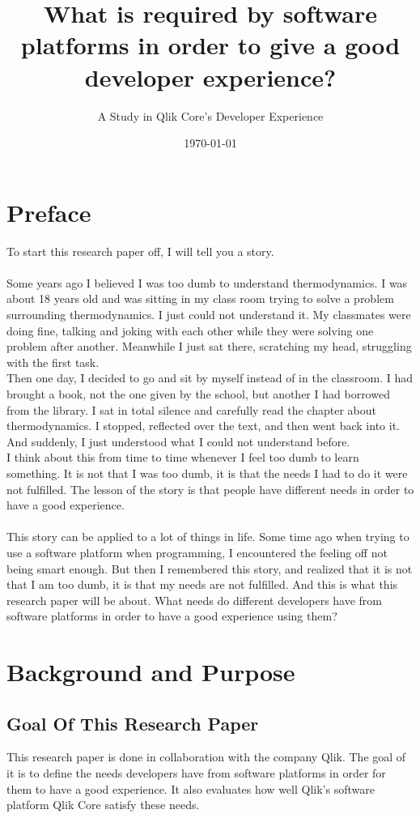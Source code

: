 \documentclass{cslthse-msc}
\title{What is required by software platforms in order to give a good developer experience?}
\subtitle{A Study in Qlik Core's Developer Experience}
\date{\today}
\begin{document}
    \makefrontmatter
    \chapter*{Preface}
    To start this research paper off, I will tell you a story.\\\\
    Some years ago I believed I was too dumb to understand thermodynamics. I was about 18 years old and was sitting in my class room trying to solve a problem surrounding thermodynamics. I just could not understand it. My classmates were doing fine, talking and joking with each other while they were solving one problem after another. Meanwhile I just sat there, scratching my head, struggling with the first task.\\
    Then one day, I decided to go and sit by myself instead of in the classroom. I had brought a book, not the one given by the school, but another I had borrowed from the library. I sat in total silence and carefully read the chapter about thermodynamics. I stopped, reflected over the text, and then went back into it. And suddenly, I just understood what I could not understand before.\\
    I think about this from time to time whenever I feel too dumb to learn something. It is not that I was too dumb, it is that the needs I had to do it were not fulfilled. The lesson of the story is that people have different needs in order to have a good experience.\\\\
    This story can be applied to a lot of things in life. Some time ago when trying to use a software platform when programming, I encountered the feeling off not being smart enough. But then I remembered this story, and realized that it is not that I am too dumb, it is that my needs are not fulfilled. And this is what this research paper will be about. What needs do different developers have from software platforms in order to have a good experience using them?
    \chapter{Background and Purpose}
    \section{Goal Of This Research Paper}
    This research paper is done in collaboration with the company Qlik. The goal of it is to define the needs developers have from software platforms in order for them to have a good experience. It also evaluates how well Qlik's software platform Qlik Core satisfy these needs.
\end{document}
